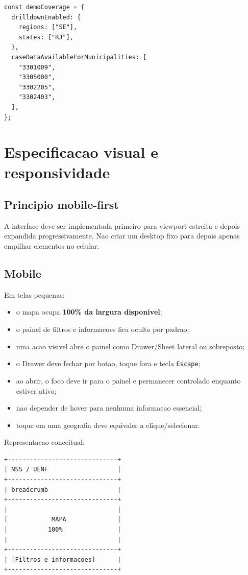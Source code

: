 \documentclass[12pt,a4paper]{article}
\begin{document}
\begin{lstlisting}
const demoCoverage = {
  drilldownEnabled: {
    regions: ["SE"],
    states: ["RJ"],
  },
  caseDataAvailableForMunicipalities: [
    "3301009",
    "3305000",
    "3302205",
    "3302403",
  ],
};
\end{lstlisting}

\section{Especificacao visual e responsividade}

\subsection{Principio mobile-first}

A interface deve ser implementada primeiro para viewport estreita e depois expandida progressivamente. Nao criar um desktop fixo para depois apenas empilhar elementos no celular.

\subsection{Mobile}

Em telas pequenas:

\begin{itemize}[leftmargin=*]
    \item o mapa ocupa \textbf{100\% da largura disponivel};
    \item o painel de filtros e informacoes fica oculto por padrao;
    \item uma acao visivel abre o painel como Drawer/Sheet lateral ou sobreposto;
    \item o Drawer deve fechar por botao, toque fora e tecla \texttt{Escape};
    \item ao abrir, o foco deve ir para o painel e permanecer controlado enquanto estiver ativo;
    \item nao depender de hover para nenhuma informacao essencial;
    \item toque em uma geografia deve equivaler a clique/selecionar.
\end{itemize}

Representacao conceitual:

\begin{lstlisting}
+------------------------------+
| NSS / UENF                   |
+------------------------------+
| breadcrumb                   |
+------------------------------+
|                              |
|            MAPA              |
|           100%               |
|                              |
+------------------------------+
| [Filtros e informacoes]      |
+------------------------------+
\end{lstlisting}
\end{document}

